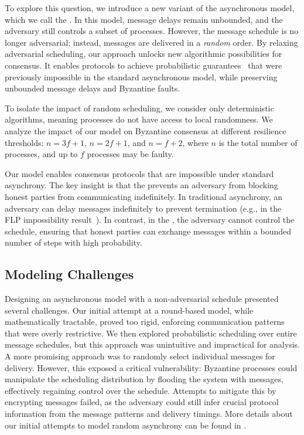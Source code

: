 To explore this question, we introduce a new variant of the asynchronous model, which we call the \textit{\model}. In this model, message delays remain unbounded, and the adversary still controls a subset of processes. However, the message schedule is no longer adversarial; instead, messages are delivered in a \textit{random} order.  By relaxing adversarial scheduling, our approach unlocks new algorithmic possibilities for consensus. It enables protocols to achieve probabilistic guarantees~\cite{probft} that were previously impossible in the standard asynchronous model, while preserving unbounded message delays and Byzantine faults.

To isolate the impact of random scheduling, we consider only deterministic algorithms, meaning processes do not have access to local randomness. We analyze the impact of our model on Byzantine consensus at different resilience thresholds: $n = 3f + 1$, $n = 2f + 1$, and $n = f + 2$, where $n$ is the total number of processes, and up to $f$ processes may be faulty.

Our model enables consensus protocols that are impossible under standard asynchrony. The key insight is that the \model prevents an adversary from blocking honest parties from communicating indefinitely. In traditional asynchrony, an adversary can delay messages indefinitely to prevent termination (e.g., in the FLP impossibility result~\cite{FLP}). In contrast, in the \model, the adversary cannot control the schedule, ensuring that honest parties can exchange messages within a bounded number of steps with high probability.

\subsection{Modeling Challenges}

Designing an asynchronous model with a non-adversarial schedule presented several challenges. Our initial attempt at a round-based model, while mathematically tractable, proved too rigid, enforcing communication patterns that were overly restrictive. We then explored probabilistic scheduling over entire message schedules, but this approach was unintuitive and impractical for analysis.
%
A more promising approach was to randomly select individual messages for delivery. However, this exposed a critical vulnerability: Byzantine processes could manipulate the scheduling distribution by flooding the system with messages, effectively regaining control over the schedule. Attempts to mitigate this by encrypting messages failed, as the adversary could still infer crucial protocol information from the message patterns and delivery timings. More details about our initial attempts to model random asynchrony can be found in .

